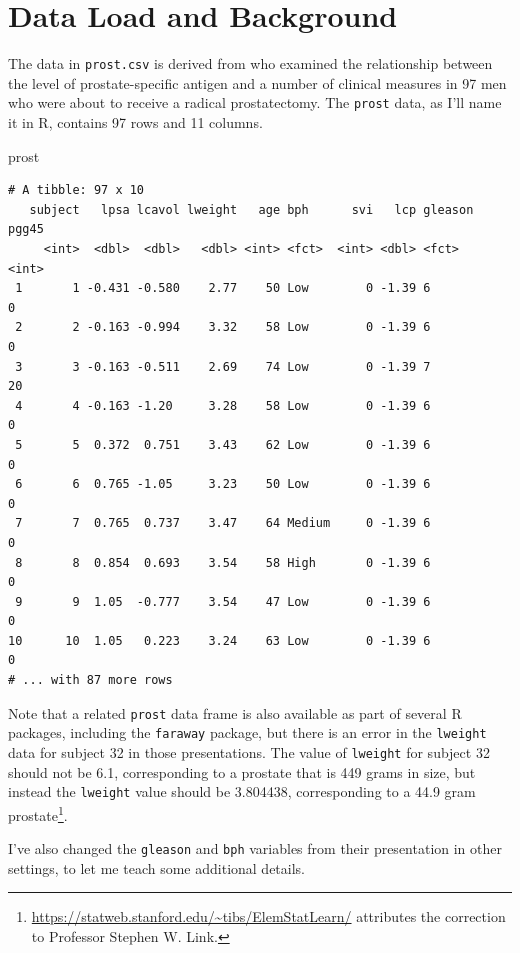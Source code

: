 \documentclass[]{book}
\newenvironment{Shaded}{\begin{snugshade}}{\end{snugshade}}
\newcommand{\NormalTok}[1]{#1}
\let\rmarkdownfootnote\footnote%
\def\footnote{\protect\rmarkdownfootnote}
\theoremstyle{definition}
\theoremstyle{definition}
\theoremstyle{definition}
\theoremstyle{remark}
\begin{document}
\section{Data Load and Background}\label{data-load-and-background}

The data in \texttt{prost.csv} is derived from \citet{Stamey1989} who
examined the relationship between the level of prostate-specific antigen
and a number of clinical measures in 97 men who were about to receive a
radical prostatectomy. The \texttt{prost} data, as I'll name it in R,
contains 97 rows and 11 columns.

\begin{Shaded}
\begin{Highlighting}[]
\NormalTok{prost}
\end{Highlighting}
\end{Shaded}

\begin{verbatim}
# A tibble: 97 x 10
   subject   lpsa lcavol lweight   age bph      svi   lcp gleason pgg45
     <int>  <dbl>  <dbl>   <dbl> <int> <fct>  <int> <dbl> <fct>   <int>
 1       1 -0.431 -0.580    2.77    50 Low        0 -1.39 6           0
 2       2 -0.163 -0.994    3.32    58 Low        0 -1.39 6           0
 3       3 -0.163 -0.511    2.69    74 Low        0 -1.39 7          20
 4       4 -0.163 -1.20     3.28    58 Low        0 -1.39 6           0
 5       5  0.372  0.751    3.43    62 Low        0 -1.39 6           0
 6       6  0.765 -1.05     3.23    50 Low        0 -1.39 6           0
 7       7  0.765  0.737    3.47    64 Medium     0 -1.39 6           0
 8       8  0.854  0.693    3.54    58 High       0 -1.39 6           0
 9       9  1.05  -0.777    3.54    47 Low        0 -1.39 6           0
10      10  1.05   0.223    3.24    63 Low        0 -1.39 6           0
# ... with 87 more rows
\end{verbatim}

Note that a related \texttt{prost} data frame is also available as part
of several R packages, including the \texttt{faraway} package, but there
is an error in the \texttt{lweight} data for subject 32 in those
presentations. The value of \texttt{lweight} for subject 32 should not
be 6.1, corresponding to a prostate that is 449 grams in size, but
instead the \texttt{lweight} value should be 3.804438, corresponding to
a 44.9 gram prostate\footnote{\url{https://statweb.stanford.edu/~tibs/ElemStatLearn/}
  attributes the correction to Professor Stephen W. Link.}.

I've also changed the \texttt{gleason} and \texttt{bph} variables from
their presentation in other settings, to let me teach some additional
details.
\end{document}
